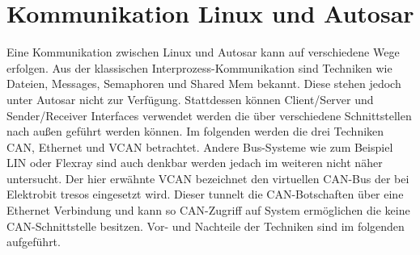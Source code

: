 \documentclass[
  a4paper,					    %
  twoside,
  DIV=calc,     				%
  bibliography=totoc,
  cleardoublepage=empty,
  ngerman,     					%
  final       					%
]{scrbook}
\begin{document}
\section{Kommunikation Linux und Autosar}
\label{sec:Kommunikation_L_A}
Eine Kommunikation zwischen Linux und Autosar kann auf verschiedene Wege erfolgen. Aus der klassischen Interprozess-Kommunikation sind Techniken wie Dateien, Messages, Semaphoren und Shared Mem bekannt. Diese stehen jedoch unter Autosar nicht zur Verfügung. Stattdessen können Client/Server und Sender/Receiver Interfaces verwendet werden die über verschiedene Schnittstellen nach außen geführt werden können. Im folgenden werden die drei Techniken CAN, Ethernet und VCAN betrachtet. Andere Bus-Systeme wie zum Beispiel LIN oder Flexray sind auch denkbar werden jedach im weiteren nicht näher untersucht. Der hier erwähnte VCAN bezeichnet den virtuellen CAN-Bus der bei Elektrobit tresos eingesetzt wird. Dieser tunnelt die CAN-Botschaften über eine Ethernet Verbindung und kann so CAN-Zugriff auf System ermöglichen die keine CAN-Schnittstelle besitzen. Vor- und Nachteile der Techniken sind im folgenden aufgeführt.
\end{document}
